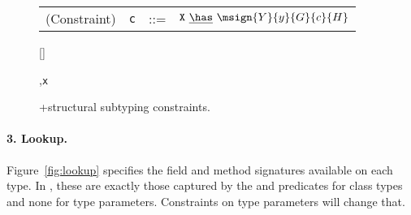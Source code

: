 \begin{figure*}
\begin{minipage}{.45\textwidth}
\centering
\begin{tabular}{r@{\quad}rcl}
  (Constraint) & {\tt c} &{::=}& ${\tt X}~\underline{\has}~\msign{Y}{y}{G}{c}{H}$
\end{tabular}

\end{minipage}%
\begin{minipage}{.55\textwidth}
\vspace{-\bigskipamount}
\quad{}
  {[]~\underline\has~}
\end{minipage}%

\begin{minipage}{\textwidth}
\quad{}
	{}

  {\Gamma,{\tt x}~\has~}

	{\Gamma\vdash\false}
\end{minipage}%
\caption{\FXG+structural subtyping constraints.}
\label{fig:FXGS}
\end{figure*}


\paragraph{3. Lookup.} Figure~\ref{fig:lookup} specifies the field and method signatures available on each type. In , these are exactly those captured by the \fields{} and \methods{} predicates for class types and none for type parameters. Constraints on type parameters will change that.

